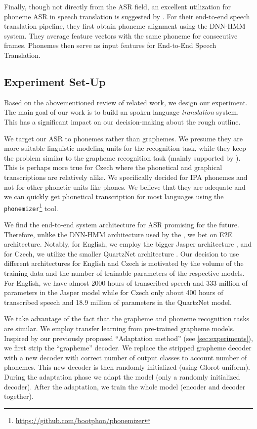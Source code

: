 Finally, though not directly from the ASR field, an excellent utilization for phoneme ASR in speech translation is suggested by . For their end-to-end speech translation pipeline, they first obtain phoneme alignment using the DNN-HMM system. They average feature vectors with the same phoneme for consecutive frames. Phonemes then serve as input features for End-to-End Speech Translation. 

\subsection{Experiment Set-Up}
\label{asr:phon:experiment}
Based on the abovementioned review of related work, we design our experiment. The main goal of our work is to build an spoken language \emph{translation} system. This has a significant impact on our decision-making about the rough outline.

We target our ASR to phonemes rather than graphemes. We presume they are more suitable linguistic modeling units for the recognition task, while they keep the problem similar to the grapheme recognition task (mainly supported by  ). This is perhaps more true for Czech where the phonetical and graphical transcriptions are relatively alike. We specifically decided for IPA phonemes and not for other phonetic units like phones. We believe that they are adequate and we can quickly get phonetical transcription for most languages using the \texttt{phonemizer}\footnote{\url{https://github.com/bootphon/phonemizer}} tool.

We find the end-to-end system architecture for ASR promising for the future. Therefore, unlike the DNN-HMM architecture used by the , we bet on E2E architecture. Notably, for English, we employ the bigger Jasper architecture , and for Czech, we utilize the smaller QuartzNet architecture . Our decision to use different architectures for English and Czech is motivated by the volume of the training data and the number of trainable parameters of the respective models. For English, we have almost 2000 hours of transcribed speech and 333 million of parameters in the Jasper model while for Czech only about 400 hours of transcribed speech and 18.9 million of parameters in the QuartzNet model.

We take advantage of the fact that the grapheme and phoneme recognition tasks are similar. We employ transfer learning from pre-trained grapheme models. Inspired by our previously proposed ``Adaptation method'' (see \cref{sec:experiments}), we first strip the ``grapheme'' decoder. We replace the stripped grapheme decoder with a new decoder with correct number of output classes to account number of phonemes. This new decoder is then randomly initialized (using Glorot uniform). During the adaptation phase we adapt the model (only a randomly initialized decoder). After the adaptation, we train the whole model (encoder and decoder together).

